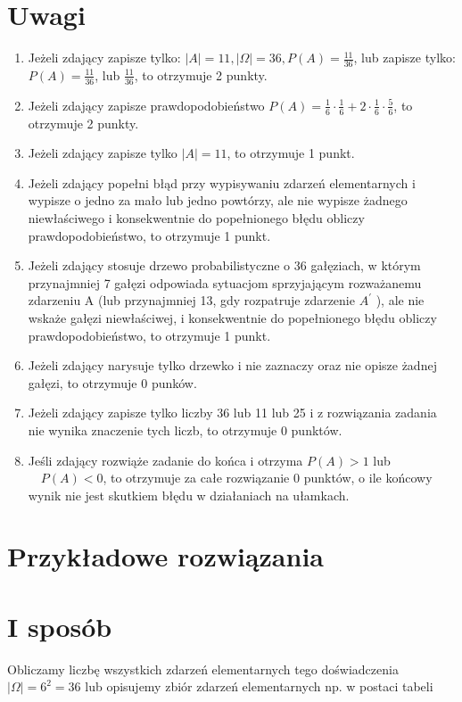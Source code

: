 \documentclass[10pt]{article}
\begin{document}
\section*{Uwagi}
\begin{enumerate}
  \item Jeżeli zdający zapisze tylko: $|A|=11,|\Omega|=36, P(A)=\frac{11}{36}$, lub zapisze tylko: $P(A)=\frac{11}{36}$, lub $\frac{11}{36}$, to otrzymuje 2 punkty.
  \item Jeżeli zdający zapisze prawdopodobieństwo $P(A)=\frac{1}{6} \cdot \frac{1}{6}+2 \cdot \frac{1}{6} \cdot \frac{5}{6}$, to otrzymuje 2 punkty.
  \item Jeżeli zdający zapisze tylko $|A|=11$, to otrzymuje 1 punkt.
  \item Jeżeli zdający popełni błąd przy wypisywaniu zdarzeń elementarnych i wypisze o jedno za mało lub jedno powtórzy, ale nie wypisze żadnego niewłaściwego i konsekwentnie do popełnionego błędu obliczy prawdopodobieństwo, to otrzymuje 1 punkt.
  \item Jeżeli zdający stosuje drzewo probabilistyczne o 36 gałęziach, w którym przynajmniej 7 gałęzi odpowiada sytuacjom sprzyjającym rozważanemu zdarzeniu A (lub przynajmniej 13, gdy rozpatruje zdarzenie $A^{\prime}$ ), ale nie wskaże gałęzi niewłaściwej, i konsekwentnie do popełnionego błędu obliczy prawdopodobieństwo, to otrzymuje 1 punkt.
  \item Jeżeli zdający narysuje tylko drzewko i nie zaznaczy oraz nie opisze żadnej gałęzi, to otrzymuje 0 punków.
  \item Jeżeli zdający zapisze tylko liczby 36 lub 11 lub 25 i z rozwiązania zadania nie wynika znaczenie tych liczb, to otrzymuje 0 punktów.
  \item Jeśli zdający rozwiąże zadanie do końca i otrzyma $P(A)>1$ lub $\quad P(A)<0$, to otrzymuje za całe rozwiązanie 0 punktów, o ile końcowy wynik nie jest skutkiem błędu w działaniach na ułamkach.
\end{enumerate}

\section*{Przykładowe rozwiązania}
\section*{I sposób}
Obliczamy liczbę wszystkich zdarzeń elementarnych tego doświadczenia $|\Omega|=6^{2}=36$ lub opisujemy zbiór zdarzeń elementarnych np. w postaci tabeli
\end{document}
